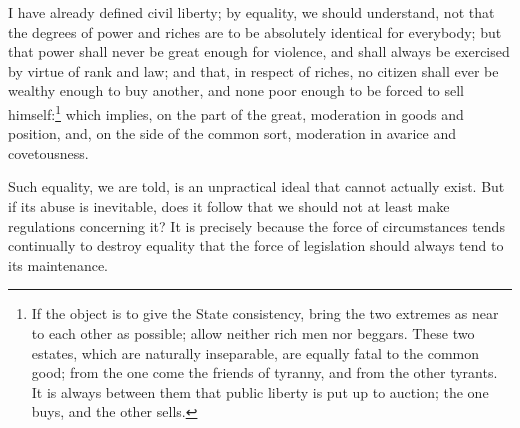 \documentclass[12pt]{book}
\begin{document}
I have already defined civil liberty; by equality, we should understand, not that the degrees of power and riches are to be absolutely identical for everybody; but that power shall never be great enough for violence, and shall always be exercised by virtue of rank and law; and that, in respect of riches, no citizen shall ever be wealthy enough to buy another, and none poor enough to be forced to sell himself:\footnote{ If the object is to give the State consistency, bring the two extremes as near to each other as possible; allow neither rich men nor beggars. These two estates, which are naturally inseparable, are equally fatal to the common good; from the one come the friends of tyranny, and from the other tyrants. It is always between them that public liberty is put up to auction; the one buys, and the other sells.} which implies, on the part of the great, moderation in goods and position, and, on the side of the common sort, moderation in avarice and covetousness.

Such equality, we are told, is an unpractical ideal that cannot actually exist. But if its abuse is inevitable, does it follow that we should not at least make regulations concerning it? It is precisely because the force of circumstances tends continually to destroy equality that the force of legislation should always tend to its maintenance.
\end{document}
